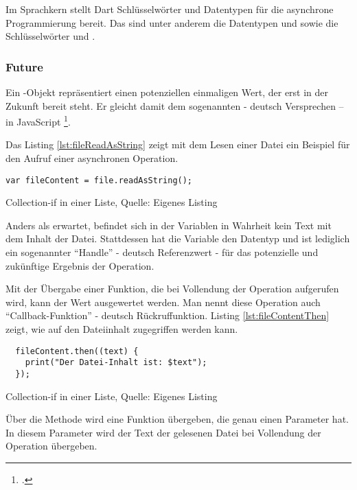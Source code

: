Im Sprachkern stellt Dart Schlüsselwörter und Datentypen für die asynchrone Programmierung bereit.
Das sind unter anderem die Datentypen  und  sowie die Schlüsselwörter  und .

\subsubsection{Future}
Ein -Objekt repräsentiert einen potenziellen einmaligen Wert, der erst in der Zukunft bereit steht.
Er gleicht damit dem sogenannten  - deutsch Versprechen – in JavaScript  \footcite[Vgl.][]{PromiseJavaScriptMDN}.

Das Listing \ref{lst:fileReadAsString} zeigt mit dem Lesen einer Datei ein Beispiel für den Aufruf einer asynchronen Operation.

\ifIncludeFigures
  \begin{listing}[ht]
    \begin{verbatim}
var fileContent = file.readAsString();
\end{verbatim}
    \caption[Collection-if in einer Liste]{Collection-if in einer Liste, Quelle: Eigenes Listing}
    \label{lst:fileReadAsString}
  \end{listing}
\fi

Anders als erwartet, befindet sich in der Variablen  in Wahrheit kein Text mit dem Inhalt der Datei.
Stattdessen hat die Variable den Datentyp  und ist lediglich ein sogenannter \enquote{Handle} - deutsch Referenzwert - für das potenzielle und zukünftige Ergebnis der Operation.

Mit der Übergabe einer Funktion, die bei Vollendung der Operation aufgerufen wird, kann der Wert ausgewertet werden.
Man nennt diese Operation auch \enquote{Callback-Funktion} - deutsch Rückruffunktion.
Listing \ref{lst:fileContentThen}
zeigt, wie auf den Dateiinhalt zugegriffen werden kann.

\ifIncludeFigures
  \begin{listing}[ht]
    \begin{verbatim}
  fileContent.then((text) {
    print("Der Datei-Inhalt ist: $text");
  });
\end{verbatim}
    \caption[Collection-if in einer Liste]{Collection-if in einer Liste, Quelle: Eigenes Listing}
    \label{lst:fileContentThen}
  \end{listing}
\fi

Über die Methode  wird eine Funktion übergeben, die genau einen Parameter hat.
In diesem Parameter wird der Text der gelesenen Datei bei Vollendung der Operation übergeben.

